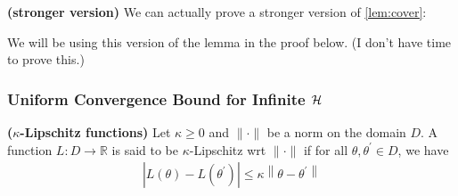 \documentclass{article}
\newcommand{\bfs}[1]{\textbf{({#1}) }}
\begin{document}
\begin{rema}\bfs{stronger version}
We can actually prove a stronger version of \cref{lem:cover}:


We will be using this version of the lemma in the proof below. (I don't have time to prove this.)
\end{rema}
\subsubsection{Uniform Convergence Bound for Infinite $\mathcal{H}$}
\begin{defa}\bfs{$\kappa$-Lipschitz functions}
  Let $\kappa \geq 0$ and $\|\cdot\|$ be a norm on the domain $D$. A function $L: D \rightarrow \mathbb{R}$ is said to be $\kappa$-Lipschitz \gls{wrt} $\|\cdot\|$ if for all $\theta, \theta^{\prime} \in D$, we have
\begin{align*}
\left|L(\theta)-L\left(\theta^{\prime}\right)\right| \leq \kappa\left\|\theta-\theta^{\prime}\right\|
\end{align*}
\end{defa}
\end{document}
